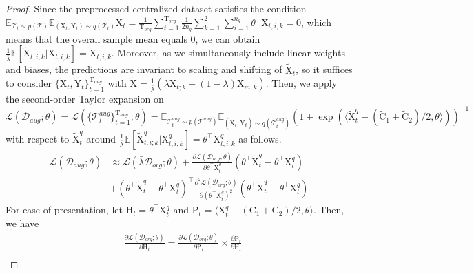 \begin{proof}
Since the preprocessed centralized dataset satisfies the condition $\mathbb E_{\mathcal{T}_t\sim p(\mathcal{T})}\mathbb E_{(\mathrm{X}_t,\mathrm{Y}_t)\sim q(\mathcal{T}_t)}\mathrm{X}_t=\frac{1}{\mathrm{T}_{org}}\sum_{t=1}^{\mathrm{T}_{org}}\frac{1}{2n_q}\sum_{k=1}^2\sum_{i=1}^{n_q}\theta^\top\mathrm{X}_{t,i;k}=0$, which means that the overall sample mean equals 0, we can obtain $\frac{1}{\bar{\lambda}}\mathbb E[\tilde{\mathrm{X}}_{t,i;k}|\mathrm{X}_{t,i;k}]=\mathrm{X}_{t,i;k}$. Moreover, as we simultaneously include linear weights and biases, the predictions are invariant to scaling and shifting of $\tilde{\mathrm{X}}_t$, so it suffices to consider $\{\tilde{\mathrm{X}}_t,\tilde{\mathrm{Y}}_t\}_{t=1}^{\mathrm{T}_{aug}}$ with $\tilde{\mathrm{X}}=\frac{1}{\bar{\lambda}}(\lambda\mathrm{X}_{t;k}+(1-\lambda)\mathrm{X}_{m;k})$. Then, we apply the second-order Taylor expansion on $\mathcal{L}(\mathcal{D}_{aug};\theta) = \mathcal{L}(\{\mathcal{T}_t^{aug}\}_{t=1}^{\mathrm{T}_{aug}};\theta)=\mathbb E_{\mathcal{T}_t^{aug} \sim p(\mathcal{T}^{aug})}\mathbb E_{(\tilde{\mathrm{X}}_t, \tilde{\mathrm{Y}}_t) \sim q(\mathcal{T}_t^{aug})}(1+\exp(\langle\tilde{\mathrm{X}}_{t}^{q}-(\tilde{\mathrm{C}}_1+\tilde{\mathrm{C}}_2)/2,\theta\rangle))^{-1}$ with respect to $\tilde{\mathrm{X}}_{t}^q$ around $\frac{1}{\bar{\lambda}}\mathbb E[\tilde{\mathrm{X}}_{t,i;k}^q|\mathrm{X}_{t,i;k}^q]=\theta^\top\mathrm{X}_{t,i;k}^q$ as follows.
\begin{equation}
    \begin{aligned}
    \label{aug}
        \mathcal{L}(\mathcal{D}_{aug};\theta) &\approx \mathcal{L}(\bar{\lambda}\mathcal{D}_{org};\theta) + \frac{\partial \mathcal{L}({\mathcal{D}_{org}};\theta)}{\partial\theta^\top\mathrm{X}_{t}^q}(\theta^\top\tilde{\mathrm{X}}_t^q-\theta^\top\mathrm{X}_t^q) \\
        &+ (\theta^\top\tilde{\mathrm{X}}_t^q-\theta^\top\mathrm{X}_t^q)^\top\frac{\partial^2 \mathcal{L}({\mathcal{D}_{org};\theta})}{\partial(\theta^\top\mathrm{X}_{t}^q)^2}(\theta^\top\tilde{\mathrm{X}}_t^q-\theta^\top\mathrm{X}_t^q)
    \end{aligned}
\end{equation}
For ease of presentation, let $\mathrm{H}_t=\theta^\top\mathrm{X}_t^q$ and $\mathrm{P}_t=\langle\mathrm{X}_t^q-(\mathrm{C}_1+\mathrm{C}_2)/2,\theta\rangle$. Then, we have 
\begin{equation}
\begin{aligned}
\label{first_order}
    &\frac{\partial \mathcal{L}({\mathcal{D}_{org}};\theta)}{\partial\mathrm{H}_t} = \frac{\partial\mathcal{L}(\mathcal{D}_{org};\theta)}{\partial \mathrm{P}_t} \times \frac{\partial{\mathrm{P}_t}}{\partial \mathrm{H}_t} \\

\end{aligned}
\end{equation}
\end{proof}
